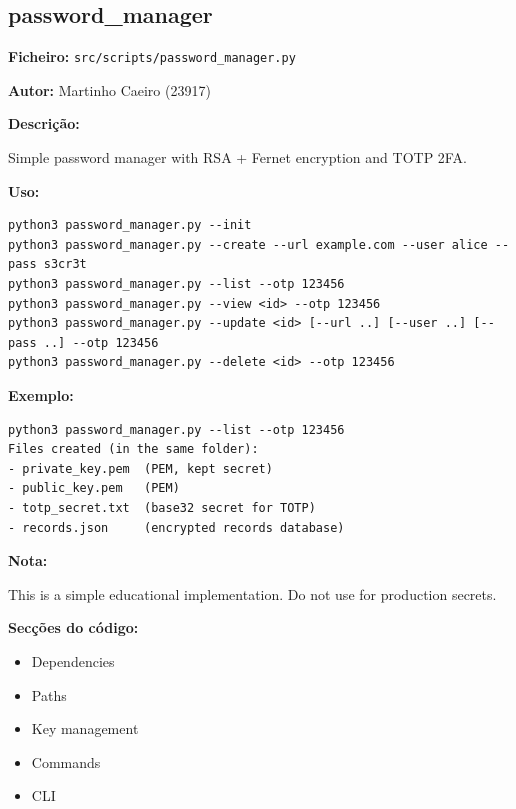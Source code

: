 \documentclass[a4paper,11pt]{article}
\begin{document}
\newpage
\subsection{password\_manager}
\label{sec:password_manager}

\textbf{Ficheiro:} \texttt{src/scripts/password\_manager.py}

\textbf{Autor:} Martinho Caeiro (23917)

\textbf{Descrição:}

Simple password manager with RSA + Fernet encryption and TOTP 2FA.

\textbf{Uso:}
\begin{verbatim}
python3 password_manager.py --init
python3 password_manager.py --create --url example.com --user alice --pass s3cr3t
python3 password_manager.py --list --otp 123456
python3 password_manager.py --view <id> --otp 123456
python3 password_manager.py --update <id> [--url ..] [--user ..] [--pass ..] --otp 123456
python3 password_manager.py --delete <id> --otp 123456
\end{verbatim}

\textbf{Exemplo:}
\begin{verbatim}
python3 password_manager.py --list --otp 123456
Files created (in the same folder):
- private_key.pem  (PEM, kept secret)
- public_key.pem   (PEM)
- totp_secret.txt  (base32 secret for TOTP)
- records.json     (encrypted records database)
\end{verbatim}

\textbf{Nota:}

This is a simple educational implementation. Do not use for production secrets.

\textbf{Secções do código:}
\begin{itemize}
    \item Dependencies
    \item Paths
    \item Key management
    \item Commands
    \item CLI
\end{itemize}
\end{document}

